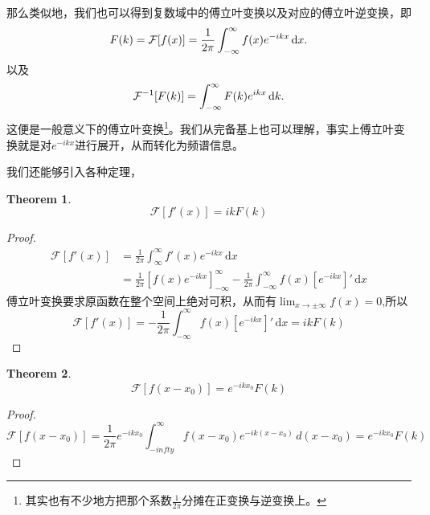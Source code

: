 \documentclass[12pt,a4paper,openany,twoside]{book}
\newtheorem{theorem}{Theorem}[section]
\numberwithin{equation}{section}
\newcommand{\ud}{\mathrm{d}}
\begin{document}
        那么类似地，我们也可以得到复数域中的傅立叶变换以及对应的傅立叶逆变换，即
        \begin{equation}
          F\qty(k)=\mathcal{F}\qty[f\qty(x)]=\frac{1}{2\pi}\int_{-\infty}^{\infty}{f\qty(x)e^{-ikx}\dd{x}} 
          .
        \end{equation}
        以及
        \begin{equation}
          \mathcal{F}^{-1}\qty[F\qty(k)]=\int_{-\infty}^\infty{F\qty(k)e^{ikx}\dd{k}}
          .
        \end{equation}
        这便是一般意义下的傅立叶变换\footnote{其实也有不少地方把那个系数$\frac{1}{2\pi}$分摊在正变换与逆变换上。}。我们从完备基上也可以理解，事实上傅立叶变换就是对$e^{-ikx}$进行展开，从而转化为频谱信息。

        我们还能够引入各种定理，
        \begin{theorem}
          \begin{equation}
            \mathcal{F}[f'(x)] = ik F(k)
          \end{equation}
        \end{theorem}
        \begin{proof}
          \begin{align*}
            \mathcal{F}[f'(x)] &=\frac{1}{2\pi}\int ^\infty_\infty f'(x) e^{-ik x} \, \ud x \\
                  &= \frac{1}{2\pi}\left[ f(x) e^{-ik x} \right] ^\infty _{-\infty} - \frac{1}{2\pi}\int ^\infty _{-\infty} f(x) \left[ e^{-ik x} \right] ' \, \ud x 
          \end{align*}
          傅立叶变换要求原函数在整个空间上绝对可积，从而有$\lim_{x\to \pm \infty} f(x) = 0$,所以
          \begin{equation*}
            \mathcal{F}[f'(x)] = - \frac{1}{2\pi}\int ^\infty_{-\infty} f(x) \left[ e^{-ik x} \right] '  \, \ud x = ik F(k) 
          \end{equation*} 
        \end{proof}
        \begin{theorem}
          \begin{equation}
            \mathcal{F}[f(x-x_0)] = e^{-ikx_0} F(k)
          \end{equation}
        \end{theorem}
        \begin{proof}
          \begin{equation*}
            \mathcal{F}[f(x-x_0)] =\frac{1}{2\pi} e^{-ikx_0}\int ^\infty_{-infty} f(x-x_0) e^{-ik(x-x_0)} \, d(x-x_0) = e^{-ikx_0} F(k)
          \end{equation*} 
        \end{proof}
\end{document}
